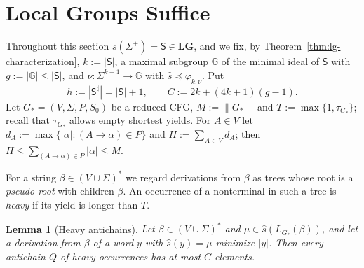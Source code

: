\documentclass[11pt]{article}
\numberwithin{equation}{section}
\theoremstyle{plain}
\newtheorem{lemma}[theorem]{Lemma}
\theoremstyle{definition}
\theoremstyle{remark}
\theoremstyle{plain}
\newcommand{\LG}{\mathbf{LG}}
\begin{document}
\section{Local Groups Suffice}
\label{sec:lg}

Throughout this section $s(\Sigma^+)=\mathsf S\in\LG$, and we fix, by
Theorem~\ref{thm:lg-characterization}, $k:=|\mathsf S|$, a maximal subgroup
$\mathbb G$ of the minimal ideal of $\mathsf S$ with $g:=|\mathbb G|\le|\mathsf S|$, and
$\nu:\Sigma^{k+1}\to\mathbb G$ with $\widehat s\preceq\varphi_{k,\nu}$.  Put
\[
 h:=|\mathsf S^\sharp|=|\mathsf S|+1,\qquad C:=2k+(4k+1)(g-1).
\]
Let $G_*=(V,\Sigma,P,S_0)$ be a reduced CFG, $M:=\|G_*\|$ and
$T:=\max\{1,\tau_{G_*}\}$; recall that $\tau_{G_*}$ allows empty shortest yields.
For $A\in V$ let $d_A:=\max\{|\alpha|:(A\to\alpha)\in P\}$ and $H:=\sum_{A\in V}d_A$;
then $H\le\sum_{(A\to\alpha)\in P}|\alpha|\le M$.

For a string $\beta\in(V\cup\Sigma)^*$ we regard derivations from $\beta$ as trees
whose root is a \emph{pseudo-root} with children $\beta$.  An occurrence of a
nonterminal in such a tree is \emph{heavy} if its yield is longer than $T$.

\begin{lemma}[Heavy antichains]
\label{lem:heavy}
Let $\beta\in(V\cup\Sigma)^*$ and $\mu\in\widehat s(L_{G_*}(\beta))$, and let a
derivation from $\beta$ of a word $y$ with $\widehat s(y)=\mu$ minimize $|y|$.  Then
every antichain $Q$ of heavy occurrences has at most $C$ elements.
\end{lemma}
\end{document}
